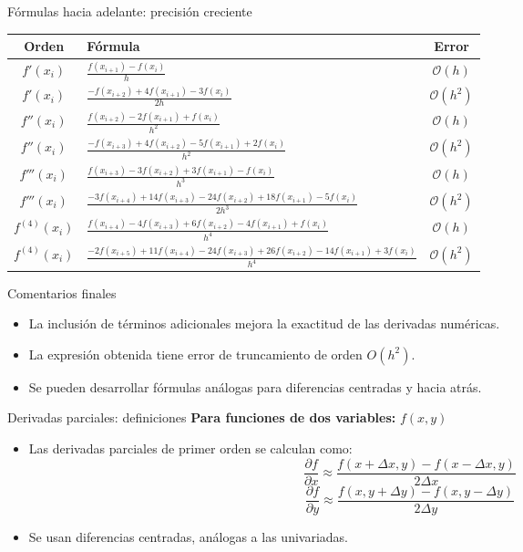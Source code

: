 \documentclass[main.tex]{subfiles}
\begin{document}
\begin{frame}{Fórmulas hacia adelante: precisión creciente}
\begin{center}
\begin{tabular}{|c|l|c|}
\hline
\textbf{Orden} & \textbf{Fórmula} & \textbf{Error} \\
\hline
$f'(x_i)$ & $\frac{f(x_{i+1}) - f(x_i)}{h}$ & $\mathcal{O}(h)$ \\
$f'(x_i)$ & $\frac{-f(x_{i+2}) + 4f(x_{i+1}) - 3f(x_i)}{2h}$ & $\mathcal{O}(h^2)$ \\
\hline
$f''(x_i)$ & $\frac{f(x_{i+2}) - 2f(x_{i+1}) + f(x_i)}{h^2}$ & $\mathcal{O}(h)$ \\
$f''(x_i)$ & $\frac{-f(x_{i+3}) + 4f(x_{i+2}) - 5f(x_{i+1}) + 2f(x_i)}{h^2}$ & $\mathcal{O}(h^2)$ \\
\hline
$f'''(x_i)$ & $\frac{f(x_{i+3}) - 3f(x_{i+2}) + 3f(x_{i+1}) - f(x_i)}{h^3}$ & $\mathcal{O}(h)$ \\
$f'''(x_i)$ & $\frac{-3f(x_{i+4}) + 14f(x_{i+3}) - 24f(x_{i+2}) + 18f(x_{i+1}) - 5f(x_i)}{2h^3}$ & $\mathcal{O}(h^2)$ \\
\hline
$f^{(4)}(x_i)$ & $\frac{f(x_{i+4}) - 4f(x_{i+3}) + 6f(x_{i+2}) - 4f(x_{i+1}) + f(x_i)}{h^4}$ & $\mathcal{O}(h)$ \\
$f^{(4)}(x_i)$ & $\frac{-2f(x_{i+5}) + 11f(x_{i+4}) - 24f(x_{i+3}) + 26f(x_{i+2}) -14f(x_{i+1}) + 3f(x_i)}{h^4}$ & $\mathcal{O}(h^2)$ \\
\hline
\end{tabular}
\end{center}
\end{frame}
\begin{frame}{Comentarios finales}
\begin{itemize}
  \item La inclusión de términos adicionales mejora la exactitud de las derivadas numéricas.
  \item La expresión obtenida tiene error de truncamiento de orden $O(h^2)$.
  \item Se pueden desarrollar fórmulas análogas para diferencias centradas y hacia atrás.
\end{itemize}
\end{frame}

\begin{frame}{Derivadas parciales: definiciones}
\textbf{Para funciones de dos variables: }$f(x,y)$
\begin{itemize}
  \item Las derivadas parciales de primer orden se calculan como:
  \[ \frac{\partial f}{\partial x} \approx \frac{f(x+\Delta x, y) - f(x - \Delta x, y)}{2\Delta x} \]
  \[ \frac{\partial f}{\partial y} \approx \frac{f(x, y+\Delta y) - f(x, y - \Delta y)}{2\Delta y} \]
  \item Se usan diferencias centradas, análogas a las univariadas.
\end{itemize}
\end{frame}
\end{document}
